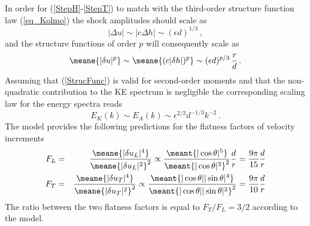 In order for (\ref{StepH}-\ref{StepT}) to match with the third-order structure function law (\ref{eq_Kolmo})  the shock amplitudes should scale as
\begin{equation} \label{Strength}
 | \Delta u | \sim | c \Delta h | \sim (\epsilon d)^{1/3} \, ,
\end{equation}
and the structure functions of order $ p $ will consequently scale as
\begin{equation} \label{StrucFunc}
\meane{|\delta u |^p}  \sim \meane{(c|\delta h |)^p} \sim  (\epsilon  d)^{p/3} \,  \frac{r}{d} \, .
\end{equation}
Assuming that (\ref{StrucFunc}) is valid for second-order moments and that the non-quadratic contribution to the KE spectrum is negligible the corresponding scaling law for the energy spectra reads
\begin{equation} \label{Spectra}
E_K(k)  \sim  E_A(k) \sim \epsilon ^{2/3} d^{-1/3} k^{-2} \, .
\end{equation}
The  model  provides the following predictions for the flatness factors of velocity increments
\begin{eqnarray} \label{FL}
F_L &=&  \frac{\meane{|\delta u_L|^4}}{\meane{|\delta u_L|^2}^2}
\propto
\frac{\meant{|\cos\theta|^5}}{\meant{|\cos\theta|^3}^2} \frac{d}{r}   = \frac{9\pi}{15}  \frac{d}{r} \\ \label{FT}
F_T &=&  \frac{\meane{|\delta u_T|^4}}{\meane{|\delta u_T|^2}^2}
\propto
\frac{\meant{|\cos\theta||\sin\theta|^4}}{\meant{|\cos\theta||\sin\theta|^2}^2} =  \frac{9\pi}{10}  \frac{d}{r}
\end{eqnarray}
The ratio between the two flatness factors is equal  to
$F_T/F_L = 3/2$ according to the model.

